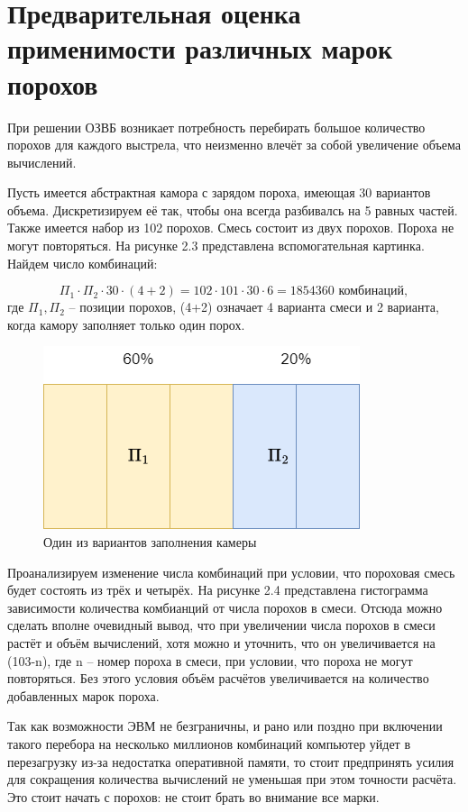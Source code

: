 \documentclass[14pt, a4paper]{extreport} %
\begin{document}
\section{Предварительная оценка применимости различных марок порохов}

При решении ОЗВБ возникает потребность перебирать большое количество порохов для каждого выстрела, что неизменно влечёт за собой увеличение объема вычислений.

Пусть имеется абстрактная камора с зарядом пороха, имеющая 30 вариантов объема. Дискретизируем её так, чтобы она всегда разбивалсь на 5 равных частей. Также имеется набор из 102 порохов. Смесь состоит из двух порохов. Пороха не могут повторяться. На рисунке 2.3 представлена вспомогательная картинка.
Найдем число комбинаций: 

\[
 \Pi_1 \cdot \Pi_2 \cdot 30 \cdot (4+2) = 102 \cdot 101 \cdot 30 \cdot 6 = 1854360 \text{ комбинаций},
\]
где $\Pi_1, \Pi_2$ -- позиции порохов, (4+2) означает 4 варианта смеси и 2 варианта, когда камору заполняет только один порох.

\begin{figure}[h]
\centering
\includegraphics[width=0.3\textheight]{imgs/KAMORA.png}
\caption{Один из вариантов заполнения камеры}
\end{figure}

Проанализируем изменение числа комбинаций при условии, что пороховая смесь будет состоять из трёх и четырёх. На рисунке 2.4 представлена гистограмма зависимости количества комбианций от числа порохов в смеси.
Отсюда можно сделать вполне очевидный вывод, что при увеличении числа порохов в смеси растёт и объём вычислений, хотя можно и уточнить, что он увеличивается на (103-n), где n -- номер пороха в смеси, при условии, что пороха не могут повторяться. Без
этого условия объём расчётов увеличивается на количество добавленных марок пороха.

Так как возможности ЭВМ не безграничны, и рано или поздно при включении такого перебора на несколько миллионов комбинаций компьютер уйдет в перезагрузку из-за недостатка оперативной памяти, то стоит предпринять усилия
для сокращения количества вычислений не уменьшая при этом точности расчёта. Это стоит начать с порохов: не стоит брать во внимание все марки.
\end{document}
